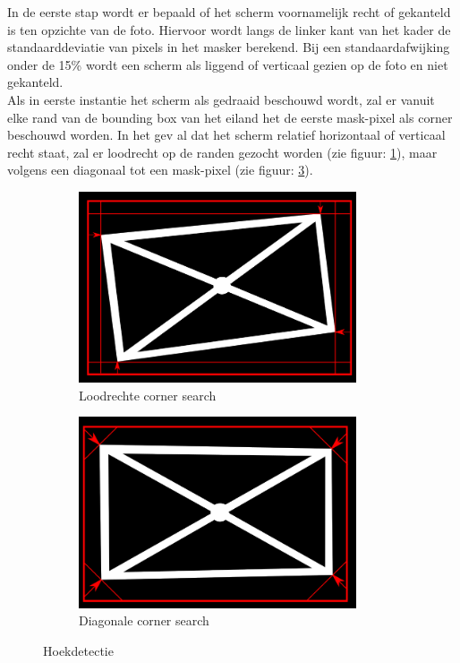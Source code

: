 In de eerste stap wordt er bepaald of het scherm voornamelijk recht of gekanteld is ten opzichte van de foto. Hiervoor wordt langs de linker kant van het kader de standaarddeviatie van pixels in het masker berekend. Bij een standaardafwijking onder de 15\% wordt een scherm als liggend of verticaal gezien op de foto en niet gekanteld.\\
Als in eerste instantie het scherm als gedraaid beschouwd wordt, zal er vanuit elke rand van de bounding box van het eiland het de eerste mask-pixel als corner beschouwd worden. In het gev  al dat het scherm relatief horizontaal of verticaal recht staat, zal er loodrecht op de randen gezocht worden (zie figuur: \ref{fig:perp search}), maar volgens een diagonaal tot een mask-pixel (zie figuur: \ref{fig:diag search}).\\
\begin{figure}[h] 
\centering
\begin{subfigure}{0.5\textwidth}
\centering
\includegraphics[width=0.9\textwidth]{img/perpSearch.png}
\caption{Loodrechte corner search}
\label{fig:perp search}
\end{subfigure}%
\begin{subfigure}{0.5\textwidth}
\centering
\includegraphics[width=0.9\textwidth]{img/diagSearch.png}
\caption{Diagonale corner search}
\label{fig:diag search}
\end{subfigure}
\caption{Hoekdetectie}
\end{figure}

